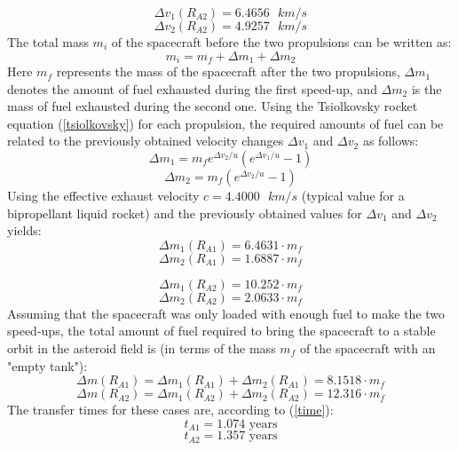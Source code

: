\documentclass[onecolumn,12pt]{article}
\numberwithin{equation}{section}
\begin{document}
\begin{equation}
    \Delta v_1 (R_{A2}) =  6.4656 \text{ } km/s
\end{equation}
\begin{equation}
    \Delta v_2 (R_{A2}) = 4.9257 \text{ } km/s
\end{equation}
The total mass $m_i$ of the spacecraft before the two propulsions can be written as:
\begin{equation}
    m_i = m_f + \Delta m_1 + \Delta m_2
\end{equation}
Here $m_f$ represents the mass of the spacecraft after the two propulsions, $\Delta m_1$ denotes the amount of fuel exhausted during the first speed-up, and $\Delta m_2$ is the mass of fuel exhausted during the second one. Using the Tsiolkovsky rocket equation (\ref{tsiolkovsky}) for each propulsion, the required amounts of fuel can be related to the previously obtained velocity changes $\Delta v_1$ and $\Delta v_2$ as follows:
\begin{equation}
    \Delta m_1 = m_f e^{\Delta v_2/u} (e^{\Delta v_1/u}-1)
\end{equation}
\begin{equation}
    \Delta m_2 = m_f (e^{\Delta v_2/u}-1)
\end{equation}
Using the effective exhaust velocity $c = 4.4000 \text{ }km/s$ (typical value for a bipropellant liquid rocket) \cite{rocketengine} and the previously obtained values for $\Delta v_1$ and $\Delta v_2$ yields:
\begin{equation}
    \Delta m_1 (R_{A1}) = 6.4631 \cdot m_f
\end{equation}
\begin{equation}
    \Delta m_2 (R_{A1}) = 1.6887 \cdot m_f
\end{equation}

\begin{equation}
    \Delta m_1 (R_{A2}) = 10.252 \cdot m_f
\end{equation}
\begin{equation}
    \Delta m_2 (R_{A2}) = 2.0633 \cdot m_f
\end{equation}
Assuming that the spacecraft was only loaded with enough fuel to make the two speed-ups, the total amount of fuel required to bring the spacecraft to a stable orbit in the asteroid field is (in terms of the mass $m_f$ of the spacecraft with an "empty tank"):
\begin{equation}
    \Delta m (R_{A1}) = \Delta m_1 (R_{A1}) + \Delta m_2 (R_{A1}) = 8.1518 \cdot m_f
    \label{fma1}
\end{equation}
\begin{equation}
    \Delta m (R_{A2}) = \Delta m_1 (R_{A2}) + \Delta m_2 (R_{A2}) = 12.316 \cdot m_f
    \label{fma2}
\end{equation}
The transfer times for these cases are, according to (\ref{time}):
\begin{equation}
    t_{A1} = 1.074 \text{ years}
\end{equation}
\begin{equation}
    t_{A2} = 1.357 \text{ years}
\end{equation}
\end{document}
